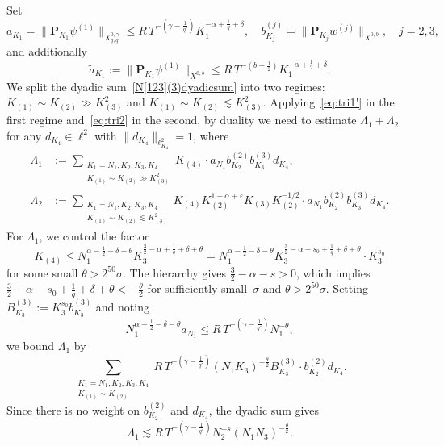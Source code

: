 \documentclass[11pt,reqno,english]{amsart}
\numberwithin{equation}{section}
\theoremstyle{plain}
\theoremstyle{definition}
\theoremstyle{remark}
\renewcommand{\epsilon}{\varepsilon}
\begin{document}
Set
\[
a_{K_1}=\|\mathbf{P}_{K_1}\psi^{(1)}\|_{X_{q,q}^{0,\gamma}}\leq R\, T^{-(\gamma-\frac{1}{q'})}K_{1}^{-\alpha+\frac{1}{q}+\delta},\quad b_{K_j}^{(j)}=\|\mathbf{P}_{K_j}w^{(j)}\|_{X^{0,b}},\quad j=2,3,
\]
and additionally
\[
\widetilde{a}_{K_1}:=\|\mathbf{P}_{K_1}\psi^{(1)}\|_{X^{0,b}}\leq R\, T^{-(b-\frac{1}{2})}K_1^{-\alpha+\frac{1}{2}+\delta}.
\]
We split the dyadic sum~\eqref{N[123](3)dyadicsum} into two regimes: $K_{(1)}\sim K_{(2)}\gg K_{(3)}^2$ and $K_{(1)}\sim K_{(2)}\lesssim K_{(3)}^2$.
Applying~\eqref{eq:tri1'} in the first regime and~\eqref{eq:tri2} in the second, by duality we need to estimate $\Lambda_1+\Lambda_2$ for any $d_{K_4}\in \ell^2$ with $\|d_{K_4}\|_{\ell_{K_4}^2}=1$, where
\begin{align*}
	\Lambda_1&:=\sum_{\substack{K_1=N_1,K_2,K_3,K_4\\
			K_{(1)}\sim K_{(2)}\gg K_{(3)}^2
	}} K_{(4)}\cdot a_{N_1}b_{K_2}^{(2)}b_{K_3}^{(3)}d_{K_4},\\
	\Lambda_2&:=\sum_{\substack{K_1=N_1,K_2,K_3,K_4\\
			K_{(1)}\sim K_{(2)}\lesssim K_{(3)}^2
	}} K_{(4)}K_{(2)}^{1-\alpha+\epsilon}K_{(3)}K_{(2)}^{-1/2} \cdot a_{N_1}b_{K_2}^{(2)}b_{K_3}^{(3)}d_{K_4}.
\end{align*}
For $\Lambda_1$, we control the factor
\[
K_{(4)}\leq N_1^{\alpha-\frac{1}{2}-\delta-\theta}K_3^{\frac{3}{2}-\alpha+\frac{1}{q}+\delta+\theta}=N_1^{\alpha-\frac{1}{2}-\delta-\theta} K_3^{\frac{3}{2}-\alpha-s_0+\frac{1}{q}+\delta+\theta}\cdot K_3^{s_0}
\]
for some small $\theta>2^{50}\sigma$. The hierarchy gives $\frac{3}{2}-\alpha-s>0$, which implies $\frac{3}{2}-\alpha-s_0+\frac{1}{q}+\delta+\theta<-\frac{\theta}{2}$ for sufficiently small~$\sigma$ and $\theta>2^{50}\sigma$.
Setting $B_{K_3}^{(3)}:=K_3^{s_0}b_{K_3}^{(3)}$ and noting
\[
N_1^{\alpha-\frac{1}{2}-\delta-\theta}a_{N_1}\leq R\, T^{-(\gamma-\frac{1}{q'})}N_1^{-\theta},
\]
we bound $\Lambda_1$ by
\[
\sum_{\substack{K_1=N_1,K_2,K_3,K_4 \\ K_{(1)}\sim K_{(2)}}} R\, T^{-(\gamma-\frac{1}{q'})}(N_1 K_3)^{-\frac{\theta}{2}} B_{K_3}^{(3)}\cdot b_{K_2}^{(2)}d_{K_4}.
\]
Since there is no weight on $b_{K_2}^{(2)}$ and $d_{K_4}$, the dyadic sum gives
\[
\Lambda_1\lesssim R\, T^{-(\gamma-\frac{1}{q'})}N_2^{-s}(N_1 N_3)^{-\frac{\theta}{2}}.
\]

\medskip
\end{document}

